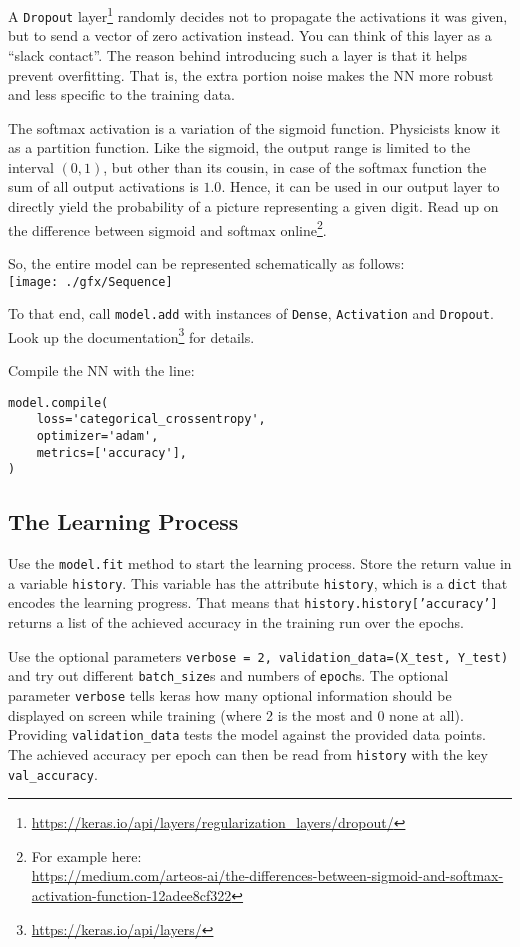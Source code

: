 \documentclass[
	english,
	fontsize=10pt,
	parskip=half,
	titlepage=true,
	DIV=12
]{scrartcl}
\newcommand*{\inPy}[1]{\texttt{#1}}
\begin{document}
A \texttt{Dropout} layer\footnote{
	\url{https://keras.io/api/layers/regularization_layers/dropout/}
}
randomly decides not to propagate the activations it was given, but to send a vector of zero activation instead. You can think of this layer as a \enquote{slack contact}. The reason behind introducing such a layer is that it helps prevent overfitting. That is, the extra portion noise makes the NN more robust and less specific to the training data.

The softmax activation is a variation of the sigmoid function. Physicists know it as a partition function. Like the sigmoid, the output range is limited to the interval $(0, 1)$, but other than its cousin, in case of the softmax function the sum of all output activations is $1.0$. Hence, it can be used in our output layer to directly yield the probability of a picture representing a given digit. Read up on the difference between sigmoid and softmax online\footnote{
	For example here:\\
	\url{https://medium.com/arteos-ai/the-differences-between-sigmoid-and-softmax-activation-function-12adee8cf322}
}.

So, the entire model can be represented schematically as follows:\\
\texttt{[image: ./gfx/Sequence]}

To that end, call \texttt{model.add} with instances of \texttt{Dense}, \texttt{Activation} and \texttt{Dropout}. Look up the documentation\footnote{
	\url{https://keras.io/api/layers/}
} for details.

Compile the NN with the line:
\begin{verbatim}
model.compile(
    loss='categorical_crossentropy',
    optimizer='adam',
    metrics=['accuracy'],
)
\end{verbatim}


\subsection{The Learning Process}
Use the \texttt{model.fit} method to start the learning process. Store the return value in a variable \texttt{history}. This variable has the attribute \texttt{history}, which is a \inPy{dict} that encodes the learning progress. That means that \inPy{history.history['accuracy']} returns a list of the achieved accuracy in the training run over the epochs.

Use the optional parameters \texttt{verbose = 2, validation\_data=(X\_test, Y\_test)} and try out different \texttt{batch\_size}s and numbers of \texttt{epoch}s. The optional parameter \texttt{verbose} tells keras how many optional information should be displayed on screen while training (where 2 is the most and 0 none at all). Providing \texttt{validation\_data} tests the model against the provided data points. The achieved accuracy per epoch can then be read from \texttt{history} with the key \texttt{val\_accuracy}.
\end{document}
